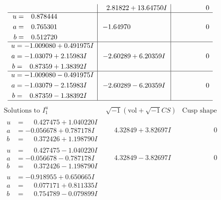 \documentclass[1p]{elsarticle_modified}
\theoremstyle{definition}
\newcommand{\I}{\sqrt{-1}}
\begin{document}
$$\begin{array}{c|c|c}
 & \phantom{-}2.81822 + 13.64750 I & \phantom{-0.000000 } 0 \\ \hline\begin{aligned}
u &= \phantom{-}0.878444\phantom{ +0.000000I} \\
a &= \phantom{-}0.765301\phantom{ +0.000000I} \\
b &= \phantom{-}0.512720\phantom{ +0.000000I}\end{aligned}
 & -1.64970\phantom{ +0.000000I} & \phantom{-0.000000 } 0 \\ \hline\begin{aligned}
u &= -1.009080 + 0.491975 I \\
a &= -1.03079 + 2.15983 I \\
b &= \phantom{-}0.87359 + 1.38392 I\end{aligned}
 & -2.60289 + 6.20359 I & \phantom{-0.000000 } 0 \\ \hline\begin{aligned}
u &= -1.009080 - 0.491975 I \\
a &= -1.03079 - 2.15983 I \\
b &= \phantom{-}0.87359 - 1.38392 I\end{aligned}
 & -2.60289 - 6.20359 I & \phantom{-0.000000 } 0\\
 \hline 
 \end{array}$$\newpage$$\begin{array}{c|c|c}  
\text{Solutions to }I^u_{1}& \I (\text{vol} + \sqrt{-1}CS) & \text{Cusp shape}\\
 \hline 
\begin{aligned}
u &= \phantom{-}0.427475 + 1.040220 I \\
a &= -0.056678 + 0.787178 I \\
b &= \phantom{-}0.372426 + 1.198790 I\end{aligned}
 & \phantom{-}4.32849 + 3.82697 I & \phantom{-0.000000 } 0 \\ \hline\begin{aligned}
u &= \phantom{-}0.427475 - 1.040220 I \\
a &= -0.056678 - 0.787178 I \\
b &= \phantom{-}0.372426 - 1.198790 I\end{aligned}
 & \phantom{-}4.32849 - 3.82697 I & \phantom{-0.000000 } 0 \\ \hline\begin{aligned}
u &= -0.918955 + 0.650665 I \\
a &= \phantom{-}0.077171 + 0.811335 I \\
b &= \phantom{-}0.754789 - 0.079899 I\end{aligned}

\end{array}$$
\end{document}
